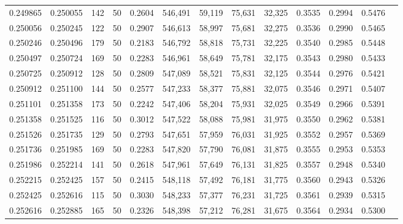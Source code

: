 \begin{tabular}{rrrrrrrrrrrrr}
0.249865 & 0.250055 &   142 &  50 &                                     0.2604 & 546,491 &  59,119 &  75,631 &  32,325 & 0.3535 & 0.2994 & 0.5476 \\
0.250056 & 0.250245 &   122 &  50 &                                     0.2907 & 546,613 &  58,997 &  75,681 &  32,275 & 0.3536 & 0.2990 & 0.5465 \\
0.250246 & 0.250496 &   179 &  50 &                                     0.2183 & 546,792 &  58,818 &  75,731 &  32,225 & 0.3540 & 0.2985 & 0.5448 \\
0.250497 & 0.250724 &   169 &  50 &                                     0.2283 & 546,961 &  58,649 &  75,781 &  32,175 & 0.3543 & 0.2980 & 0.5433 \\
0.250725 & 0.250912 &   128 &  50 &                                     0.2809 & 547,089 &  58,521 &  75,831 &  32,125 & 0.3544 & 0.2976 & 0.5421 \\
0.250912 & 0.251100 &   144 &  50 &                                     0.2577 & 547,233 &  58,377 &  75,881 &  32,075 & 0.3546 & 0.2971 & 0.5407 \\
0.251101 & 0.251358 &   173 &  50 &                                     0.2242 & 547,406 &  58,204 &  75,931 &  32,025 & 0.3549 & 0.2966 & 0.5391 \\
0.251358 & 0.251525 &   116 &  50 &                                     0.3012 & 547,522 &  58,088 &  75,981 &  31,975 & 0.3550 & 0.2962 & 0.5381 \\
0.251526 & 0.251735 &   129 &  50 &                                     0.2793 & 547,651 &  57,959 &  76,031 &  31,925 & 0.3552 & 0.2957 & 0.5369 \\
0.251736 & 0.251985 &   169 &  50 &                                     0.2283 & 547,820 &  57,790 &  76,081 &  31,875 & 0.3555 & 0.2953 & 0.5353 \\
0.251986 & 0.252214 &   141 &  50 &                                     0.2618 & 547,961 &  57,649 &  76,131 &  31,825 & 0.3557 & 0.2948 & 0.5340 \\
0.252215 & 0.252425 &   157 &  50 &                                     0.2415 & 548,118 &  57,492 &  76,181 &  31,775 & 0.3560 & 0.2943 & 0.5326 \\
0.252425 & 0.252616 &   115 &  50 &                                     0.3030 & 548,233 &  57,377 &  76,231 &  31,725 & 0.3561 & 0.2939 & 0.5315 \\
0.252616 & 0.252885 &   165 &  50 &                                     0.2326 & 548,398 &  57,212 &  76,281 &  31,675 & 0.3564 & 0.2934 & 0.5300 \\

\end{tabular}
